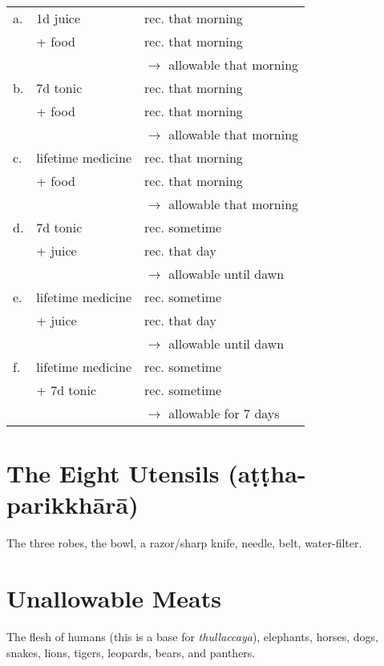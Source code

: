\begin{tabular}{@{}lll@{}}
  a. & 1d juice & rec. that morning \\
     &  + food     & rec. that morning \\
     &             & \(\rightarrow\) allowable that morning \\
  \hline
  b. & 7d tonic & rec. that morning \\
     & + food   & rec. that morning \\
     &          & \(\rightarrow\) allowable that morning \\
  \hline
  c. & lifetime medicine & rec. that morning \\
     & + food            & rec. that morning \\
     &                   & \(\rightarrow\) allowable that morning \\
  \hline
  d. & 7d tonic & rec. sometime \\
     & + juice  & rec. that day \\
     &          & \(\rightarrow\) allowable until dawn \\
  \hline
  e. & lifetime medicine & rec. sometime \\
     & + juice           & rec. that day \\
     &                   & \(\rightarrow\) allowable until dawn \\
  \hline
  f. & lifetime medicine & rec. sometime \\
     & + 7d tonic        & rec. sometime \\
     &                   & \(\rightarrow\) allowable for 7 days \\
\end{tabular}


\section*{The Eight Utensils (aṭṭha-parikkhārā)}

The three robes, the bowl, a razor/sharp knife, needle, belt, water-filter.\\
\mbox{}

\section*{Unallowable Meats}

The flesh of humans (this is a base for \emph{thullaccaya}), elephants, horses,
dogs, snakes, lions, tigers, leopards, bears, and panthers.\\
\mbox{}

